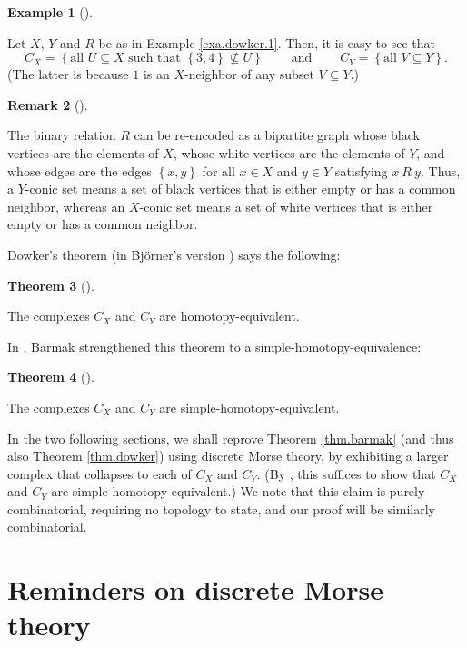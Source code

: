 \documentclass[numbers=enddot,12pt,final,onecolumn,notitlepage]{scrartcl}%
\theoremstyle{definition}
\newtheorem{theo}{Theorem}[section]
\newenvironment{theorem}[1][]
{\begin{theo}[#1]\begin{leftbar}}
{\end{leftbar}\end{theo}}
\newtheorem{remk}[theo]{Remark}
\newenvironment{remark}[1][]
{\begin{remk}[#1]\begin{leftbar}}
{\end{leftbar}\end{remk}}
\newtheorem{exam}[theo]{Example}
\newenvironment{example}[1][]
{\begin{exam}[#1]\begin{leftbar}}
{\end{leftbar}\end{exam}}
\begin{document}
\begin{example}
\label{exa.dowker.2}Let $X$, $Y$ and $R$ be as in Example \ref{exa.dowker.1}.
Then, it is easy to see that%
\[
C_{X}=\left\{  \text{all }U\subseteq X\text{ such that }\left\{  3,4\right\}
\not \subseteq U\right\}  \ \ \ \ \ \ \ \ \ \ \text{and}%
\ \ \ \ \ \ \ \ \ \ C_{Y}=\left\{  \text{all }V\subseteq Y\right\}  .
\]
(The latter is because $1$ is an $X$-neighbor of any subset $V\subseteq Y$.)
\end{example}

\begin{remark}
\label{rmk.bipar} The binary relation $R$ can be re-encoded as a bipartite
graph whose black vertices are the elements of $X$, whose white vertices are
the elements of $Y$, and whose edges are the edges $\left\{  x,y\right\}  $
for all $x\in X$ and $y\in Y$ satisfying $x\ R\ y$. Thus, a $Y$-conic set
means a set of black vertices that is either empty or has a common neighbor,
whereas an $X$-conic set means a set of white vertices that is either empty or
has a common neighbor.
\end{remark}

Dowker's theorem (in Bj\"{o}rner's version \cite[Theorem 10.9]{Bjorne95}) says
the following:

\begin{theorem}
[Dowker's theorem]\label{thm.dowker}The complexes $C_{X}$ and $C_{Y}$ are homotopy-equivalent.
\end{theorem}

In \cite[Theorem 4.4]{Barmak11}, Barmak strengthened this theorem to a
simple-homotopy-equivalence:

\begin{theorem}
\label{thm.barmak}The complexes $C_{X}$ and $C_{Y}$ are
simple-homotopy-equivalent. %
\end{theorem}

In the two following sections, we shall reprove Theorem \ref{thm.barmak} (and
thus also Theorem \ref{thm.dowker}) using discrete Morse theory, by exhibiting
a larger complex that collapses to each of $C_{X}$ and $C_{Y}$. (By
\cite[Proposition 9.28]{Kozlov20}, this suffices to show that $C_{X}$ and
$C_{Y}$ are simple-homotopy-equivalent.) We note that this claim is purely
combinatorial, requiring no topology to state, and our proof will be similarly combinatorial.

\section{Reminders on discrete Morse theory}
\end{document}
